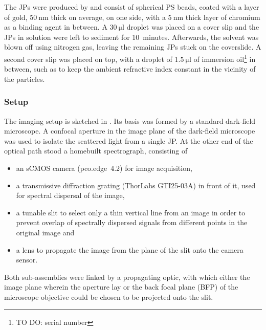 \documentclass[10pt]{article}
\newcommand{\reffig}[2]{\mbox{\sffamily{Figure \ref{#1}#2}}}
\begin{document}
\begin{multicols}{2}
The JPs were produced by  and consist of spherical PS beads, coated with a layer of gold, $\SI{50}{\nano\meter}$ thick on average, on one side, with a $\SI{5}{\nano\meter}$ thick layer of chromium as a binding agent in between. 
A $\SI{30}{\micro\litre}$ droplet was placed on a cover slip and the JPs in solution were left to sediment for \mbox{10 minutes}. 
Afterwards, the solvent was blown off using nitrogen gas, leaving the remaining JPs stuck on the coverslide. 
A second cover slip was placed on top, with a droplet of $\SI{1.5}{\micro\litre}$ of immersion oil\footnote{TO DO: serial number} in between, such as to keep the ambient refractive index constant in the vicinity of the particles.   

\subsubsection*{Setup}

The imaging setup is sketched in \reffig{fig:setup}{C}. 
Its basis was formed by a standard dark-field microscope. 
A confocal aperture in the image plane of the dark-field microscope was used to isolate the scattered light from a single JP. 
At the other end of the optical path stood a homebuilt spectrograph, consisting of 
\begin{itemize}
    \item an sCMOS camera \mbox{\sffamily(pco.edge 4.2)} for image acquisition, 
    \item a transmissive diffraction grating {\sffamily(ThorLabs GTI25-03A)} in front of it, used for spectral dispersal of the image,
    \item a tunable slit to select only a thin vertical line from an image in order to prevent overlap of spectrally dispersed signals from different points in the original image and
    \item a lens to propagate the image from the plane of the slit onto the camera sensor.  
\end{itemize}

Both sub-assemblies were linked by a propagating optic, with which either the image plane wherein the aperture lay or the back focal plane (BFP) of the microscope objective could be chosen to be projected onto the slit.


\end{multicols}
\end{document}
